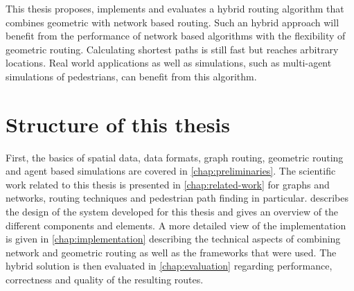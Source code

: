 	This thesis proposes, implements and evaluates a hybrid routing algorithm that combines geometric with network based routing.
	Such an hybrid approach will benefit from the performance of network based algorithms with the flexibility of geometric routing.
	Calculating shortest paths is still fast but reaches arbitrary locations.
	Real world applications as well as simulations, such as multi-agent simulations of pedestrians, can benefit from this algorithm.
	
\section{Structure of this thesis}

	First, the basics of spatial data, data formats, graph routing, geometric routing and agent based simulations are covered in \cref{chap:preliminaries}.
	The scientific work related to this thesis is presented in \cref{chap:related-work} for graphs and networks, routing techniques and pedestrian path finding in particular.
	 describes the design of the system developed for this thesis and gives an overview of the different components and elements.
	A more detailed view of the implementation is given in \cref{chap:implementation} describing the technical aspects of combining network and geometric routing as well as the frameworks that were used.
	The hybrid solution is then evaluated in \cref{chap:evaluation} regarding performance, correctness and quality of the resulting routes.